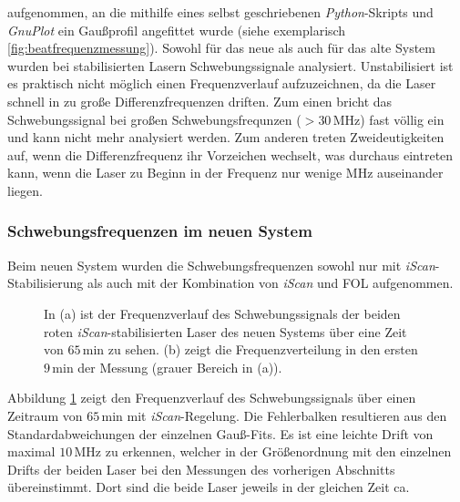 aufgenommen, an die  mithilfe eines selbst geschriebenen \textit{Python}-Skripts
und \textit{GnuPlot} ein Gaußprofil angefittet wurde (siehe exemplarisch
\ref{fig:beatfrequenzmessung}).
Sowohl für das neue als auch für das alte System wurden bei stabilisierten
Lasern Schwebungssignale analysiert. Unstabilisiert ist es praktisch nicht
möglich einen Frequenzverlauf aufzuzeichnen, da die Laser schnell in zu
große Differenzfrequenzen driften. Zum einen bricht das Schwebungssignal
bei großen Schwebungsfrequnzen ($>30\,$MHz) fast völlig ein und kann nicht mehr
analysiert werden. Zum anderen treten Zweideutigkeiten auf, wenn die
Differenzfrequenz ihr Vorzeichen wechselt, was durchaus eintreten kann, wenn die
Laser zu Beginn in der Frequenz nur wenige MHz auseinander liegen.

\subsubsection{Schwebungsfrequenzen im neuen
System}\label{subsubsec:beatfrequenzmessung_neues_system}
Beim neuen System wurden die Schwebungsfrequenzen sowohl nur mit
\textit{iScan}-Stabilisierung als auch mit der Kombination von \textit{iScan}
und FOL aufgenommen.
\begin{figure}[hp]
 	\centering
 	\footnotesize
 	\fbox{\parbox{\dimexpr \linewidth - 2\fboxrule - 2\fboxsep}{
 	\subfloat[]{
		\label{subfig:beatfrequenzen_neu_iScan_drift}
		
		}\\
 	\subfloat[]{
		\label{subfig:beatfrequenzen_neu_iScan_histogramm}
		
		}
	}}
	\caption[Beatfrequenzen - neues System mit \textit{iScan}]{In (a) ist der
	Frequenzverlauf des Schwebungssignals der beiden roten
	\textit{iScan}-stabilisierten Laser des neuen Systems über eine Zeit von
	$65\,$min zu sehen.
	(b) zeigt die Frequenzverteilung in den ersten $9\,$min der Messung (grauer
	Bereich in (a)).}
	\label{fig:beatfrequenzen_neu_iScan}
\end{figure}
Abbildung
\ref{fig:beatfrequenzen_neu_iScan} zeigt den Frequenzverlauf des Schwebungssignals über einen Zeitraum von $65\,$min mit
\textit{iScan}-Regelung. Die Fehlerbalken resultieren aus den
Standardabweichungen der einzelnen Gauß-Fits. Es ist eine leichte Drift von
maximal $10\,$MHz zu erkennen, welcher in der Größenordnung mit den
einzelnen Drifts der beiden Laser bei den Messungen des vorherigen Abschnitts
übereinstimmt. Dort sind die beide Laser jeweils in der gleichen Zeit ca.
